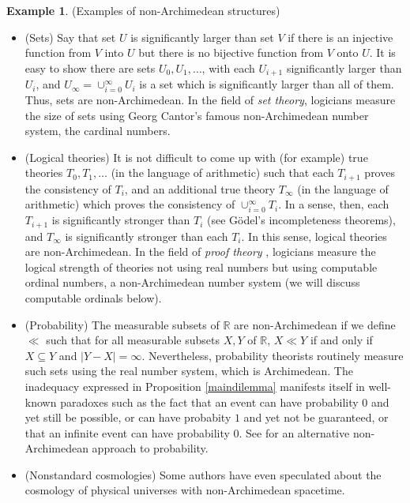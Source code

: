 \documentclass[reqno]{article}
\theoremstyle{definition}
\newtheorem{example}[theorem]{Example}
\begin{document}
\begin{example}
(Examples of non-Archimedean structures)
    \begin{itemize}
        \item
        (Sets)
        Say that set $U$ is significantly larger than set $V$ if there is an injective
        function from $V$ into $U$ but there is no bijective function from $V$
        onto $U$. It is easy to show there are sets $U_0,U_1,\ldots$, with each
        $U_{i+1}$ significantly larger than $U_i$, and $U_\infty=\cup_{i=0}^\infty U_i$
        is a set which is significantly larger than all of them. Thus, sets are
        non-Archimedean. In the field of \emph{set theory}, logicians measure
        the size of sets using Georg Cantor's famous non-Archimedean number system,
        the cardinal numbers.
        \item
        (Logical theories)
        It is not difficult to come up with (for example) true
        theories $T_0,T_1,\ldots$ (in the language of arithmetic) such that
        each $T_{i+1}$ proves the consistency of $T_i$, and an additional
        true theory $T_\infty$ (in the language of arithmetic)
        which proves the consistency of $\cup_{i=0}^\infty T_i$.
        In a sense, then, each $T_{i+1}$ is significantly stronger than $T_i$
        (see G\"odel's incompleteness theorems), and $T_\infty$ is
        significantly stronger than each $T_i$. In this sense, logical theories
        are non-Archimedean. In the field
        of \emph{proof theory} \cite{pohlers2008proof},
        logicians measure the logical strength of theories not using real numbers
        but using computable ordinal numbers, a non-Archimedean number system
        (we will discuss computable ordinals below).
        \item
        (Probability)
        The measurable subsets of $\mathbb R$ are non-Archimedean
        if we define $\ll$ such that for all measurable subsets
        $X,Y$ of $\mathbb R$, $X\ll Y$ if and only if
        $X\subseteq Y$ and $|Y-X|=\infty$.
        Nevertheless, probability theorists routinely
        measure such sets using the real number system, which is Archimedean.
        The inadequacy expressed in Proposition \ref{maindilemma}
        manifests itself in well-known paradoxes such as the fact that
        an event can have probability $0$ and yet still be possible,
        or can have probabity $1$ and yet not be guaranteed,
        or that an infinite event can have probability $0$.
        See \cite{benci2013non} for an alternative non-Archimedean approach
        to probability.
        \item
        (Nonstandard cosmologies)
        Some authors \cite{andreka2012logic} \cite{rosinger2007cosmic} have
        even speculated about the cosmology of physical universes
        with non-Archimedean spacetime.
    \end{itemize}
\end{example}
\end{document}
